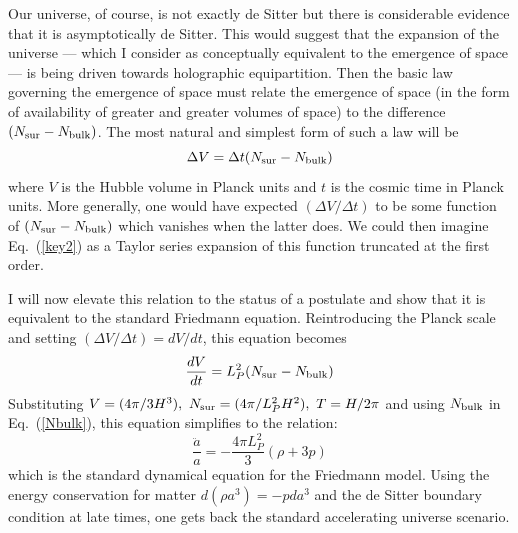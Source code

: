 \documentclass[aps,prd,showpacs,nofootinbib,floats,floatfix,preprintnumbers,groupedaddress,twocolumn]{revtex4}
\def\eq#1{{Eq.~(\ref{#1})}}
\begin{document}
Our universe, of course, is not exactly de Sitter but there is 
considerable evidence that it is asymptotically de Sitter. This would suggest that the expansion of the universe --- which I consider as conceptually equivalent to the emergence of space --- is being driven towards holographic equipartition. Then the basic law governing the emergence of space must relate the emergence of space (in the form of availability of greater and greater volumes of space) to the difference $(N_{\rm sur} - N_{\rm bulk})$. The most natural and simplest form of such a law will be 
\begin{equation}
 \Delta V = \Delta t (N_{\rm sur} - N_{\rm bulk})
\label{key2}
\end{equation} 
 where $V$ is the Hubble volume in Planck units and $t$ is the cosmic time in Planck units. More generally, one would have expected $(\Delta V/\Delta t)$ to be some function of $(N_{\rm sur} - N_{\rm bulk})$ which vanishes when the latter does.
We could then imagine \eq{key2} as a Taylor series expansion of this function truncated at the first order. 

I will now elevate this relation to the status of a postulate and show that it is equivalent to the standard Friedmann equation. Reintroducing the Planck scale and setting $(\Delta V/\Delta t ) = dV/dt$, this equation becomes
\begin{equation}
 \frac{dV}{dt} = L_P^2 (N_{\rm sur} - N_{\rm bulk})
\end{equation} 
Substituting $V= (4\pi/3H^3), \ N_{\rm sur} = (4\pi/L_P^2 H^2), \ T=H/2\pi$ and using $N_{\rm bulk}$ in \eq{Nbulk}, this equation simplifies to the relation:
\begin{equation}
 \frac{\ddot a}{a}=- \frac{4\pi L_P^2}{3} (\rho + 3p)
\label{frw}
\end{equation} 
which is the standard dynamical equation for the Friedmann model. Using the energy conservation for matter $d(\rho a^3) = -pda^3$ and the de Sitter boundary condition at late times, one gets back the standard accelerating universe scenario. 
\end{document}
